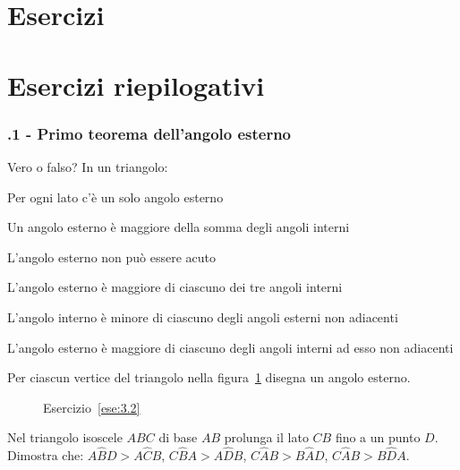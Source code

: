 \section{Esercizi}

\section{Esercizi riepilogativi}

\subsubsection*{\thechapter.1 - Primo teorema dell'angolo esterno}

\begin{esercizio}
\label{ese:3.1}
Vero o falso? In un triangolo:
\begin{enumeratea}
\item Per ogni lato c'è un solo angolo esterno\hfill\boxV\quad\boxF
\item Un angolo esterno è maggiore della somma degli angoli interni\hfill\boxV\quad\boxF
\item L'angolo esterno non può essere acuto\hfill\boxV\quad\boxF
\item L'angolo esterno è maggiore di ciascuno dei tre angoli interni\hfill\boxV\quad\boxF
\item L'angolo interno è minore di ciascuno degli angoli esterni non adiacenti\hfill\boxV\quad\boxF
\item L'angolo esterno è maggiore di ciascuno degli angoli interni ad esso non adiacenti\tab\tab\hfill\boxV\quad\boxF
\end{enumeratea}
\end{esercizio}

\begin{esercizio}
\label{ese:3.2}
Per ciascun vertice del triangolo nella figura~\ref{fig:ese3.2} disegna un angolo esterno.
\end{esercizio}

\begin{figure}[htb]
\centering
\caption{Esercizio~\ref{ese:3.2}}\label{fig:ese3.2}
\end{figure}

\begin{esercizio}
\label{ese:3.3}
Nel triangolo isoscele $ABC$ di base $AB$ prolunga il lato $CB$ fino a un punto $D$. Dimostra che: $A\widehat{B}D>A\widehat{C}B$, $C\widehat{B}A>A\widehat{D}B$, $C\widehat{A}B>B\widehat{A}D$, $C\widehat{A}B>B\widehat{D}A$.
\end{esercizio}

